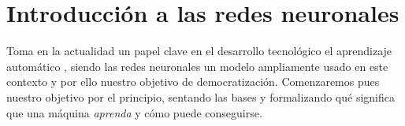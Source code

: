 
\chapter{Introducción a las redes neuronales} 

Toma en la actualidad un papel clave en el desarrollo tecnológico el aprendizaje automático
\cite{importancia-arte-aprendizaje-automatico}, siendo 
las redes neuronales un modelo ampliamente usado en este contexto y por ello 
nuestro objetivo de democratización. 
Comenzaremos pues nuestro objetivo por el principio, sentando las bases y 
formalizando 
qué significa 
que una máquina \textit{aprenda} y cómo puede conseguirse. 
